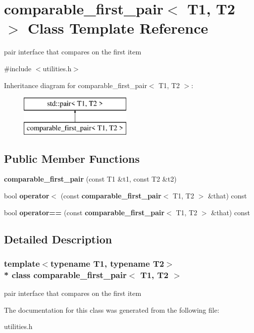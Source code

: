 \section{comparable\+\_\+first\+\_\+pair$<$ T1, T2 $>$ Class Template Reference}
\label{classcomparable__first__pair}


pair interface that compares on the first item  




{\ttfamily \#include $<$utilities.\+h$>$}

Inheritance diagram for comparable\+\_\+first\+\_\+pair$<$ T1, T2 $>$\+:\begin{figure}[H]
\begin{center}
\leavevmode
\includegraphics[height=2.000000cm]{classcomparable__first__pair}
\end{center}
\end{figure}
\subsection*{Public Member Functions}
\begin{DoxyCompactItemize}
\item 
{\bfseries comparable\+\_\+first\+\_\+pair} (const T1 \&t1, const T2 \&t2)
\item 
bool {\bfseries operator$<$} (const {\bf comparable\+\_\+first\+\_\+pair}$<$ T1, T2 $>$ \&that) const 
\item 
bool {\bfseries operator==} (const {\bf comparable\+\_\+first\+\_\+pair}$<$ T1, T2 $>$ \&that) const 
\end{DoxyCompactItemize}


\subsection{Detailed Description}
\subsubsection*{template$<$typename T1, typename T2$>$\\*
class comparable\+\_\+first\+\_\+pair$<$ T1, T2 $>$}

pair interface that compares on the first item 

The documentation for this class was generated from the following file\+:\begin{DoxyCompactItemize}
\item 
utilities.\+h\end{DoxyCompactItemize}
